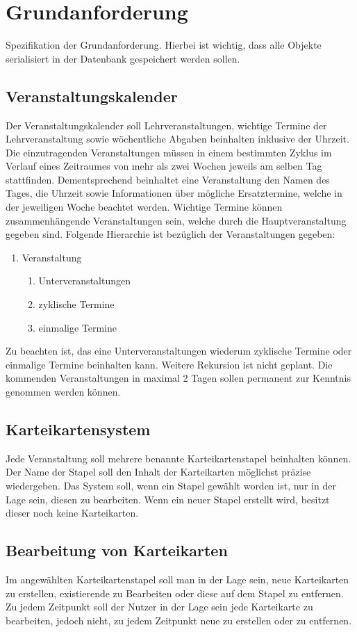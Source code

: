 \documentclass[
a4paper,
twoside,
DIV=12,
BCOR=8mm,
headlineinclude=true,
footinclude=false,
numbers=noenddot,
headheight=40pt, 11pt]{scrartcl}
\begin{document}
\section{Grundanforderung}
Spezifikation der Grundanforderung. Hierbei ist wichtig, dass alle Objekte serialisiert in der Datenbank gespeichert werden sollen.
\subsection{Veranstaltungskalender}
Der Veranstaltungskalender soll Lehrveranstaltungen, wichtige Termine der Lehrveranstaltung sowie wöchentliche Abgaben beinhalten inklusive der Uhrzeit. Die einzutragenden Veranstaltungen müssen in einem bestimmten Zyklus im Verlauf eines Zeitraumes von mehr als zwei Wochen jeweils am selben Tag stattfinden. Dementsprechend beinhaltet eine Veranstaltung den Namen des Tages, die Uhrzeit sowie Informationen über mögliche Ersatztermine, welche in der jeweiligen Woche beachtet werden. Wichtige Termine können zusammenhängende Veranstaltungen sein, welche durch die Hauptveranstaltung gegeben sind. Folgende Hierarchie ist bezüglich der Veranstaltungen gegeben:
\begin{enumerate}
	\item[] Veranstaltung
	\begin{enumerate}
		\item[] Unterveranstaltungen
		\item[] zyklische Termine
		\item[] einmalige Termine
	\end{enumerate}
\end{enumerate} 
Zu beachten ist, das eine Unterveranstaltungen wiederum zyklische Termine oder einmalige Termine beinhalten kann. Weitere Rekursion ist nicht geplant. Die kommenden Veranstaltungen in maximal 2 Tagen sollen permanent zur Kenntnis genommen werden können.
\subsection{Karteikartensystem}
Jede Veranstaltung soll mehrere benannte Karteikartenstapel beinhalten können. Der Name der Stapel soll den Inhalt der Karteikarten möglichst präzise wiedergeben. Das System soll, wenn ein Stapel gewählt worden ist, nur in der Lage sein, diesen zu bearbeiten. Wenn ein neuer Stapel erstellt wird, besitzt dieser noch keine Karteikarten.
\subsection{Bearbeitung von Karteikarten}
Im angewählten Karteikartenstapel soll man in der Lage sein, neue Karteikarten zu erstellen, existierende zu Bearbeiten oder diese auf dem Stapel zu entfernen. Zu jedem Zeitpunkt soll der Nutzer in der Lage sein jede Karteikarte zu bearbeiten, jedoch nicht, zu jedem Zeitpunkt neue zu erstellen oder zu entfernen. 
\end{document}
